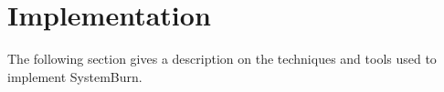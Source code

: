 \section{Implementation}

The following section gives a description on the techniques and tools used to implement SystemBurn. 
